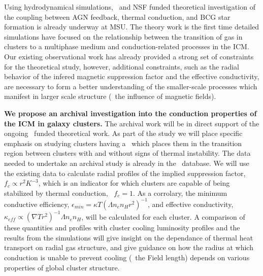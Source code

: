 \documentclass[letterpaper,11pt]{article}
\begin{document}
Using hydrodynamical simulations, \chandra\ and NSF funded theoretical
investigation of the coupling between AGN feedback, thermal
conduction, and BCG star formation is already underway at MSU. The
theory work is the first time detailed simulations have focused on the
relationship between the transition of gas in clusters to a multiphase
medium and conduction-related processes in the ICM. Our existing
observational work has already provided a strong set of constraints
for the theoretical study, however, additional constraints, such as
the radial behavior of the infered magnetic suppression factor and the
effective conductivity, are necessary to form a better understanding
of the smaller-scale processes which manifest in larger scale
structure (\eg\ the influence of magnetic fields).

{\bf{We propose an archival investigation into the conduction
    properties of the ICM in galaxy clusters.}} The archival work will
be in direct support of the ongoing \chandra\ funded theoretical
work. As part of the study we will place specific emphasis on studying
clusters having a \kna\ which places them in the transition region
between clusters with and without signs of thermal instability. The
data needed to undertake an archival study is already in the
\accept\ database. We will use the existing data to calculate radial
profiles of the implied suppression factor, $f_c \propto r^2 K^{-3}$,
which is an indicator for which clusters are capable of being
stabilized by thermal conduction, \ie\ $f_c = 1$. As a corrolary, the
minimum conductive efficiency, $\epsilon_{min} = \kappa T (\Lambda n_e
n_H r^2)^{-1}$, and effective conductivity, $\kappa_{eff} \propto
(\nabla{T} r^2)^{-1} \Lambda n_e n_H$, will be calculated for each
cluster. A comparison of these quantities and profiles with cluster
cooling luminosity profiles and the results from the simulations will
give insight on the dependance of thermal heat transport on radial gas
structure, and give guidance on how the radius at which conduction is
unable to prevent cooling (\eg\ the Field length) depends on various
properties of global cluster structure.

\large
\begin{center}
\end{center}
\normalsize
\end{document}
